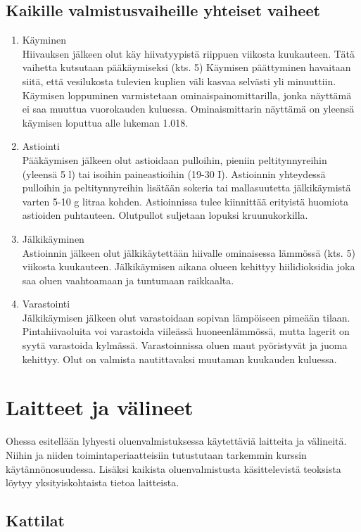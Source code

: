 \documentclass[a4paper,11pt]{report}
\begin{document}
\subsection{Kaikille valmistusvaiheille yhteiset vaiheet}
\begin{enumerate}
\item Käyminen \hfill \\
Hiivauksen jälkeen olut käy hiivatyypistä riippuen viikosta kuukauteen. Tätä vaihetta kutsutaan pääkäymiseksi (kts. 5) Käymisen päättyminen havaitaan siitä, että vesilukosta tulevien kuplien väli kasvaa selvästi yli minuuttiin. Käymisen loppuminen varmistetaan ominaispainomittarilla, jonka näyttämä ei saa muuttua vuorokauden kuluessa. Ominaismittarin näyttämä on yleensä käymisen loputtua alle lukeman 1.018.
\item Astiointi \hfill \\
Pääkäymisen jälkeen olut astioidaan pulloihin, pieniin peltitynnyreihin (yleensä 5 l) tai isoihin paineastioihin (19-30 I). Astioinnin yhteydessä pulloihin ja peltitynnyreihin lisätään sokeria tai mallasuutetta jälkikäymistä varten 5-10 g litraa kohden. Astioinnissa tulee kiinnittää erityistä huomiota astioiden puhtauteen. Olutpullot suljetaan lopuksi kruunukorkilla.
\item Jälkikäyminen \hfill \\
Astioinnin jälkeen olut jälkikäytettään hiivalle ominaisessa lämmössä (kts. 5) viikosta kuukauteen. Jälkikäymisen aikana olueen kehittyy hiilidioksidia joka saa oluen vaahtoamaan ja tuntumaan raikkaalta.
\item Varastointi \hfill \\
Jälkikäymisen jälkeen olut varastoidaan sopivan lämpöiseen pimeään tilaan. Pintahiivaoluita voi varastoida viileässä huoneenlämmössä, mutta lagerit on syytä varastoida kylmässä. Varastoinnissa oluen maut pyöristyvät ja juoma kehittyy. Olut on valmista nautittavaksi muutaman kuukauden kuluessa.
\end{enumerate}
\section{Laitteet ja välineet}

Ohessa esitellään lyhyesti oluenvalmistuksessa käytettäviä laitteita ja välineitä. Niihin ja niiden toimintaperiaatteisiin tutustutaan tarkemmin kurssin käytännönosuudessa. Lisäksi kaikista oluenvalmistusta käsittelevistä teoksista löytyy yksityiskohtaista tietoa laitteista.

\subsection*{Kattilat}
\end{document}
